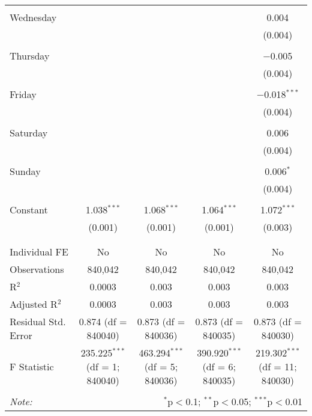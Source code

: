 \documentclass[
]{article}
\begin{document}
\begin{table}[!htbp]
{\begin{tabular}{@{\extracolsep{5pt}}lcccc}
  & & & & \\ 
 Wednesday &  &  &  & 0.004 \\ 
  &  &  &  & (0.004) \\ 
  & & & & \\ 
 Thursday &  &  &  & $-$0.005 \\ 
  &  &  &  & (0.004) \\ 
  & & & & \\ 
 Friday &  &  &  & $-$0.018$^{***}$ \\ 
  &  &  &  & (0.004) \\ 
  & & & & \\ 
 Saturday &  &  &  & 0.006 \\ 
  &  &  &  & (0.004) \\ 
  & & & & \\ 
 Sunday &  &  &  & 0.006$^{*}$ \\ 
  &  &  &  & (0.004) \\ 
  & & & & \\ 
 Constant & 1.038$^{***}$ & 1.068$^{***}$ & 1.064$^{***}$ & 1.072$^{***}$ \\ 
  & (0.001) & (0.001) & (0.001) & (0.003) \\ 
  & & & & \\ 
\hline \\[-1.8ex] 
Individual FE & No & No & No & No \\ 
Observations & 840,042 & 840,042 & 840,042 & 840,042 \\ 
R$^{2}$ & 0.0003 & 0.003 & 0.003 & 0.003 \\ 
Adjusted R$^{2}$ & 0.0003 & 0.003 & 0.003 & 0.003 \\ 
Residual Std. Error & 0.874 (df = 840040) & 0.873 (df = 840036) & 0.873 (df = 840035) & 0.873 (df = 840030) \\ 
F Statistic & 235.225$^{***}$ (df = 1; 840040) & 463.294$^{***}$ (df = 5; 840036) & 390.920$^{***}$ (df = 6; 840035) & 219.302$^{***}$ (df = 11; 840030) \\ 
\hline 
\hline \\[-1.8ex] 
\textit{Note:}  & \multicolumn{4}{r}{$^{*}$p$<$0.1; $^{**}$p$<$0.05; $^{***}$p$<$0.01} \\ 
\end{tabular}
} 
\end{table} 
\newpage
\end{document}
